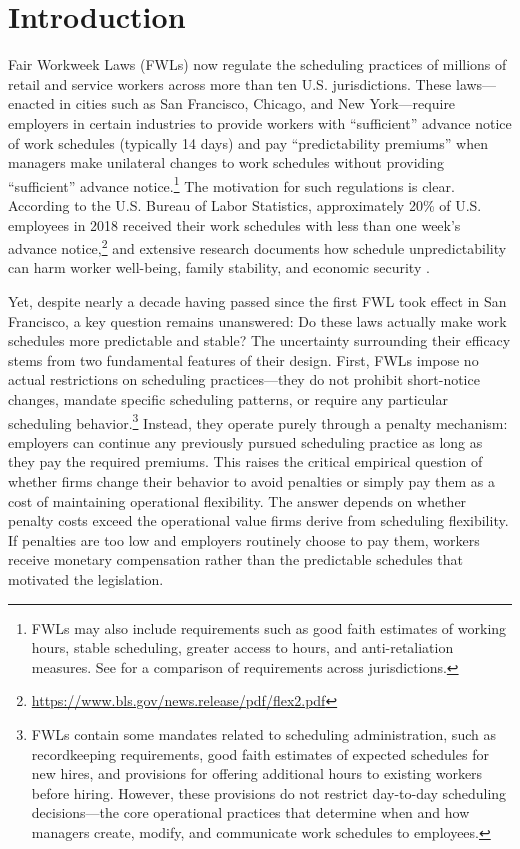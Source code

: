 \documentclass[letterpaper,11pt,leqno]{article}
\theoremstyle{paper}
\begin{document}
\section{Introduction} \label{sec:intro}
Fair Workweek Laws (FWLs) now regulate the scheduling practices of millions of retail and service workers across more than ten U.S. jurisdictions. These laws—enacted in cities such as San Francisco, Chicago, and New York—require employers in certain industries to provide workers with ``sufficient'' advance notice of work schedules (typically 14 days) and pay ``predictability premiums'' when managers make unilateral changes to work schedules without providing ``sufficient'' advance notice.\footnote{FWLs may also include requirements such as good faith estimates of working hours, stable scheduling, greater access to hours, and anti-retaliation measures. See \cite{fw_info} for a comparison of requirements across jurisdictions.} The motivation for such regulations is clear. According to the U.S. Bureau of Labor Statistics, approximately 20\% of U.S. employees in 2018 received their work schedules with less than one week's advance notice,\footnote{\url{https://www.bls.gov/news.release/pdf/flex2.pdf}} and extensive research documents how schedule unpredictability can harm worker well-being, family stability, and economic security \citep{henly_lambert_2014, clasp_2015, Lambert218, seattle_pp, ananant_emeryville}.

Yet, despite nearly a decade having passed since the first FWL took effect in San Francisco, a key question remains unanswered: Do these laws actually make work schedules more predictable and stable? The uncertainty surrounding their efficacy stems from two fundamental features of their design. First, FWLs impose no actual restrictions on scheduling practices—they do not prohibit short-notice changes, mandate specific scheduling patterns, or require any particular scheduling behavior.\footnote{FWLs contain some mandates related to scheduling administration, such as recordkeeping requirements, good faith estimates of expected schedules for new hires, and provisions for offering additional hours to existing workers before hiring. However, these provisions do not restrict day-to-day scheduling decisions—the core operational practices that determine when and how managers create, modify, and communicate work schedules to employees.} Instead, they operate purely through a penalty mechanism: employers can continue any previously pursued scheduling practice as long as they pay the required premiums. This raises the critical empirical question of whether firms change their behavior to avoid penalties or simply pay them as a cost of maintaining operational flexibility. The answer depends on whether penalty costs exceed the operational value firms derive from scheduling flexibility. If penalties are too low and employers routinely choose to pay them, workers receive monetary compensation rather than the predictable schedules that motivated the legislation. 
\end{document}
